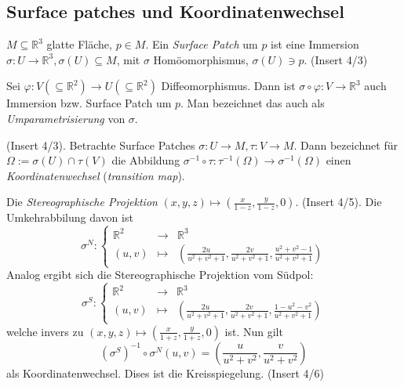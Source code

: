 \documentclass[11pt]{article}
\begin{document}
\subsection{Surface patches und Koordinatenwechsel}

\begin{definition}
$M\subseteq \mathbb R^3$ glatte Fläche, $p\in M$. Ein \textit{Surface Patch} um $p$ ist eine Immersion $\sigma: U\to \mathbb R^3, \sigma(U)\subseteq M$, mit $\sigma$ Homöomorphismus, $\sigma(U)\ni p$. (Insert 4/3)
\end{definition}
\begin{remark}
Sei $\varphi: V (\subseteq \mathbb R^2) \to U (\subseteq \mathbb R^2)$ Diffeomorphismus. Dann ist $\sigma\circ \varphi: V\to \mathbb R^3$ auch Immersion bzw. Surface Patch um $p$. Man bezeichnet das auch als \textit{Umparametrisierung} von $\sigma$.
\end{remark}
\begin{definition}
(Insert 4/3). Betrachte Surface Patches $\sigma: U\to M, \tau: V\to M$. Dann bezeichnet für $\Omega:= \sigma(U)\cap \tau(V)$ die Abbildung $\sigma^{-1}\circ \tau: \tau^{-1}(\Omega)\to \sigma^{-1}(\Omega)$ einen \textit{Koordinatenwechsel} (\textit{transition map}).
\end{definition}
\begin{example}
Die \textit{Stereographische Projektion} $(x, y, z)\mapsto (\frac x{1-z}, \frac y{1-z}, 0)$. (Insert 4/5). Die Umkehrabbilung davon ist \begin{equation*}
    \sigma^N:\left\{\begin{array}{ccc}
         \mathbb R^2&\to &\mathbb R^3  \\
         (u,v)&\mapsto & \left(\frac{2u}{u^2+v^2+1}, \frac{2v}{u^2+v^2+1}, \frac{u^2+v^2-1}{u^2+v^2+1}\right) 
    \end{array}\right.
\end{equation*}
Analog ergibt sich die Stereographische Projektion vom Südpol:
\begin{equation*}
    \sigma^S:\left\{\begin{array}{ccc}
         \mathbb R^2&\to &\mathbb R^3  \\
         (u,v)&\mapsto & \left(\frac{2u}{u^2+v^2+1}, \frac{2v}{u^2+v^2+1}, \frac{1-u^2-v^2}{u^2+v^2+1}\right) 
    \end{array}\right.
\end{equation*}
welche invers zu $(x, y, z)\mapsto (\frac x{1+z}, \frac y{1+z}, 0)$ ist. Nun gilt \begin{equation*}
    \left(\sigma^S\right)^{-1}\circ \sigma^N(u, v) = \left(\frac u{u^2+v^2}, \frac v{u^2+v^2}\right)
\end{equation*} als Koordinatenwechsel. Dises ist die Kreisspiegelung. (Insert 4/6)
\end{example}
\end{document}
